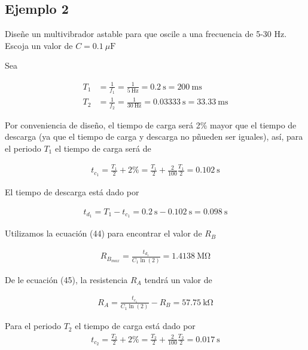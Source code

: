 \documentclass{article}
\begin{document}
\newpage

\subsection*{Ejemplo 2}
Diseñe un multivibrador astable para que oscile a una frecuencia de 5-30 Hz. Escoja un valor de $C = \qty{0.1}{\mu \farad}$

Sea

\begin{align}
	T_1 &= \frac{1}{f_1} = \frac{1}{\qty{5}{\hertz}} = \qty{0.2}{\second} = \qty{200}{\milli \second} \nonumber \\
	T_2 &= \frac{1}{f_2} = \frac{1}{\qty{30}{\hertz}} = \qty{0.03333}{\second} = \qty{33.33}{\milli \second} \nonumber
\end{align}

Por conveniencia de diseño, el tiempo de carga será 2\% mayor que el tiempo de descarga (ya que el tiempo de carga y descarga no pñueden ser iguales), así, para el periodo $T_1$ el tiempo de carga será de

\begin{align}
	t_{c_1} = \frac{T_1}{2} + 2\% = \frac{T_1}{2} + \frac{2}{100}\frac{T_1}{2} = \qty{0.102}{\second}
\end{align}

El tiempo de descarga está dado por

\begin{align}
	t_{d_1} = T_1 - t_{c_1} = \qty{0.2}{\second} - \qty{0.102}{\second} = \qty{0.098}{\second} \nonumber
\end{align} 

Utilizamos la ecuación (44) para encontrar el valor de $R_B$

\begin{align}
	R_{B_{max}} = \frac{t_{d_1}}{C_1 \ln(2)} = \qty{1.4138}{\mega \ohm} \nonumber
\end{align}

De le ecuación (45), la resistencia $R_A$ tendrá un valor de

\begin{align}
	R_A = \frac{t_{c_1}}{C_1 \ln(2)} - R_B = \qty{57.75}{\kilo \ohm}\nonumber
\end{align}

Para el periodo $T_2$ el tiempo de carga está dado por
\begin{align}
	t_{c_2} = \frac{T_2}{2} + 2\% = \frac{T_2}{2} + \frac{2}{100}\frac{T_2}{2}  = \qty{0.017}{\second} \nonumber
\end{align}
\end{document}
